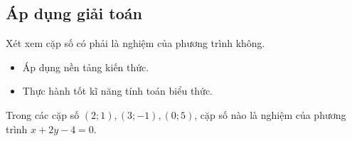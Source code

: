 \subsection{Áp dụng giải toán}

\begin{dang}{Xét xem cặp số có phải là nghiệm của phương trình không.}
	\begin{itemize}
		\item Áp dụng nền tảng kiến thức.
		\item Thực hành tốt kĩ năng tính toán biểu thức.
	\end{itemize}
	
\end{dang}

\begin{vd}
	Trong các cặp số $(2;1),(3;-1),(0;5)$, cặp số nào là nghiệm của phương trình $x+2y-4=0$.
\end{vd}

